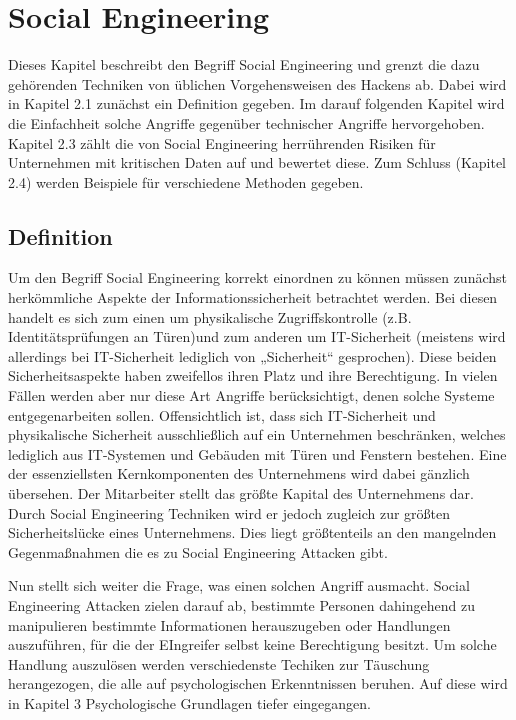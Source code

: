 \section{Social Engineering}\label{sec:socialengineering}
Dieses Kapitel beschreibt den Begriff Social Engineering und grenzt die dazu gehörenden Techniken von üblichen Vorgehensweisen des Hackens ab. Dabei wird in Kapitel 2.1 zunächst ein Definition gegeben. Im darauf folgenden Kapitel wird die Einfachheit solche Angriffe gegenüber technischer Angriffe hervorgehoben. Kapitel 2.3 zählt die von Social Engineering herrührenden Risiken für Unternehmen mit kritischen Daten auf und bewertet diese. Zum Schluss (Kapitel 2.4) werden Beispiele für verschiedene Methoden gegeben.

\subsection{Definition}\label{sec:definition}
Um den Begriff Social Engineering korrekt einordnen zu können müssen zunächst herkömmliche Aspekte der Informationssicherheit betrachtet werden. Bei diesen handelt es sich zum einen um physikalische Zugriffskontrolle (z.B. Identitätsprüfungen an Türen)und zum anderen um IT-Sicherheit (meistens wird allerdings bei IT-Sicherheit lediglich von „Sicherheit“ gesprochen). Diese beiden Sicherheitsaspekte haben zweifellos ihren Platz und ihre Berechtigung. In vielen Fällen werden aber nur diese Art Angriffe berücksichtigt, denen solche Systeme entgegenarbeiten sollen. Offensichtlich ist, dass sich IT-Sicherheit und physikalische Sicherheit ausschließlich auf ein Unternehmen beschränken, welches lediglich aus IT-Systemen und Gebäuden mit Türen und Fenstern bestehen. Eine der essenziellsten Kernkomponenten des Unternehmens wird dabei gänzlich übersehen. Der Mitarbeiter stellt das größte Kapital des Unternehmens dar. Durch Social Engineering Techniken wird er jedoch zugleich zur größten Sicherheitslücke eines Unternehmens. Dies liegt größtenteils an den mangelnden Gegenmaßnahmen die es zu Social Engineering Attacken gibt.

Nun stellt sich weiter die Frage, was einen solchen Angriff ausmacht. Social Engineering Attacken zielen darauf ab, bestimmte Personen dahingehend zu manipulieren bestimmte Informationen herauszugeben oder Handlungen auszuführen, für die der EIngreifer selbst keine Berechtigung besitzt. Um solche Handlung auszulösen werden verschiedenste Techiken zur Täuschung herangezogen, die alle auf psychologischen Erkenntnissen beruhen. Auf diese wird in Kapitel 3 Psychologische Grundlagen tiefer eingegangen.

